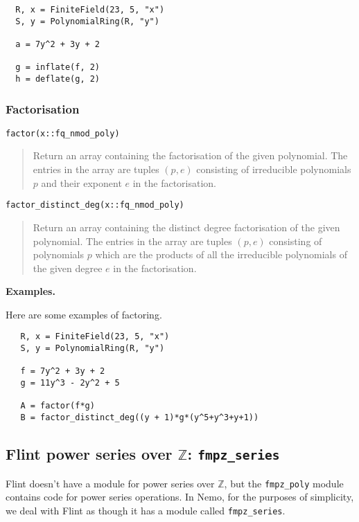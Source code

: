 \documentclass[a4paper,10pt]{article}
\newcommand{\Z}{\mathbb{Z}}
\newcommand{\code}{\lstinline}
\newcommand{\desc}[1]{\vspace{-3mm}\begin{quote}#1\end{quote}}
\begin{document}
{{\begin{lstlisting}
  R, x = FiniteField(23, 5, "x")
  S, y = PolynomialRing(R, "y")

  a = 7y^2 + 3y + 2

  g = inflate(f, 2)
  h = deflate(g, 2)
\end{lstlisting}

\subsubsection{Factorisation}

\begin{lstlisting}
factor(x::fq_nmod_poly)
\end{lstlisting}

\desc{Return an array containing the factorisation of the given polynomial. The entries in
the array are tuples $(p, e)$ consisting of irreducible polynomials $p$ and their exponent
$e$ in the factorisation.}

\begin{lstlisting}
factor_distinct_deg(x::fq_nmod_poly)
\end{lstlisting}

\desc{Return an array containing the distinct degree factorisation of the given polynomial.
The entries in the array are tuples $(p, e)$ consisting of polynomials $p$ which are the
products of all the irreducible polynomials of the given degree $e$ in the factorisation.}

\textbf{Examples.}

Here are some examples of factoring.

\begin{lstlisting}
   R, x = FiniteField(23, 5, "x")
   S, y = PolynomialRing(R, "y")

   f = 7y^2 + 3y + 2
   g = 11y^3 - 2y^2 + 5

   A = factor(f*g)
   B = factor_distinct_deg((y + 1)*g*(y^5+y^3+y+1))
\end{lstlisting}

\subsection{Flint power series over $\Z$: \code{fmpz_series}}

Flint doesn't have a module for power series over $\Z$, but the \code{fmpz_poly}
module contains code for power series operations. In Nemo, for the purposes of
simplicity, we deal with Flint as though it has a module called \code{fmpz_series}.

}}
\end{document}

